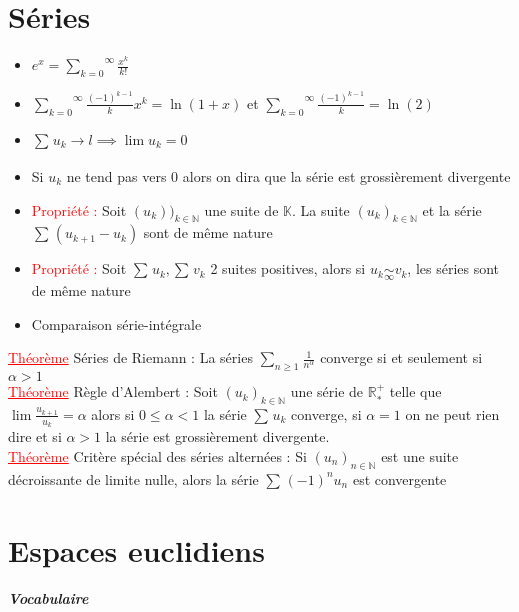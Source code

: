 \documentclass[a4paper, french]{article}
\newcommand{\R}{\mathbb{R}}
\newcommand{\N}{\mathbb{N}}
\newcommand{\K}{\mathbb{K}}
\newcommand{\al}{\alpha}
\newcommand{\som}[2]{\overset{#2}{\underset{#1}{\sum}}}
\newcommand{\thm}{\textcolor{red}{\underline{Théorème} }}
\newcommand{\ppt}{\textcolor{red}{Propriété : }}
\newcommand{\limit}[1]{\underset{#1}{\rightarrow}}
\newcommand{\eq}[1]{\underset{#1}{\sim}}
\newcommand{\inv}[1]{\frac{1}{#1}}
\begin{document}
	\section{Séries}
	\begin{itemize}
 		\item $e^x=\som{k=0}{\infty}\frac{x^k}{k!}$
 		\item $\som{k=0}{\infty}\frac{(-1)^{k-1}}{k}x^k=\ln(1+x)$ et $\som{k=0}{\infty}\frac{(-1)^{k-1}}{k}=\ln(2)$
		\item $\som{}{}u_k \limit{}l \implies \lim u_k=0$
		\item Si $u_k$ ne tend pas vers 0 alors on dira que la série est grossièrement divergente
		\item \ppt Soit $(u_k))_{k \in \N}$ une suite de $\K$. La suite $(u_k)_{k \in \N}$ et la série $\som{}{}(u_{k+1}-u_k)$ sont de même nature
		\item \ppt Soit $\som{}{}u_k,\som{}{}v_k$ 2 suites positives, alors si $u_k \eq{\infty} v_k$, les séries sont de même nature
		\item Comparaison série-intégrale
	\end{itemize}
	 \thm Séries de Riemann : La séries $\som{n\geqslant 1}{} \inv{n^\al}$ converge si et seulement si $\al > 1$ \\
	 \thm Règle d'Alembert : Soit $(u_k)_{k \in \N}$ une série de $\R_*^+$ telle que $\lim \frac{u_{k+1}}{u_k}=\al$ alors si $0 \leqslant \al <1$ la série $\som{}{}u_k$ converge, si $\al=1$ on ne peut rien dire et si $\al>1$ la série est grossièrement divergente. \\
	 \thm Critère spécial des séries alternées : Si $(u_n)_{n \in \N}$ est une suite décroissante de limite nulle, alors la série $\som{}{}(-1)^nu_n$ est convergente


	 \section{Espaces euclidiens}
	 
	 \subparagraph{Vocabulaire}
	 
\end{document}
